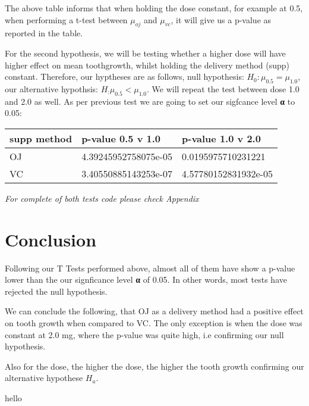 \documentclass[]{article}
\begin{document}
The above table informs that when holding the dose constant, for example
at 0.5, when performing a t-test between \(μ_{oj}\) and \(μ_{vc}\), it
will give us a p-value as reported in the table.

For the second hypothesis, we will be testing whether a higher dose will
have higher effect on mean toothgrowth, whilst holding the delivery
method (supp) constant. Therefore, our hyptheses are as follows, null
hypothesis: \textbf{\(H_0:μ_{0.5} = μ_{1.0}\)}, our alternative
hypothsis: \textbf{\(H_:μ_{0.5} < μ_{1.0}\)}. We will repeat the test
between dose 1.0 and 2.0 as well. As per previous test we are going to
set our sigfcance level \textbf{α} to 0.05:

\begin{longtable}[]{@{}lll@{}}
\toprule
supp method & p-value 0.5 v 1.0 & p-value 1.0 v 2.0\tabularnewline
\midrule
\endhead
OJ & 4.39245952758075e-05 & 0.0195975710231221\tabularnewline
VC & 3.40550885143253e-07 & 4.57780152831932e-05\tabularnewline
\bottomrule
\end{longtable}

\emph{For complete of both tests code please check Appendix}

\section{Conclusion}\label{conclusion}

Following our T Tests performed above, almost all of them have show a
p-value lower than the our signficance level \textbf{α} of 0.05. In
other words, most tests have rejected the null hypothesis.

We can conclude the following, that OJ as a delivery method had a
positive effect on tooth growth when compared to VC. The only exception
is when the dose was constant at 2.0 mg, where the p-value was quite
high, i.e confirming our null hypothesis.

Also for the dose, the higher the dose, the higher the tooth growth
confirming our alternative hypothese \(H_a\).

hello
\end{document}
